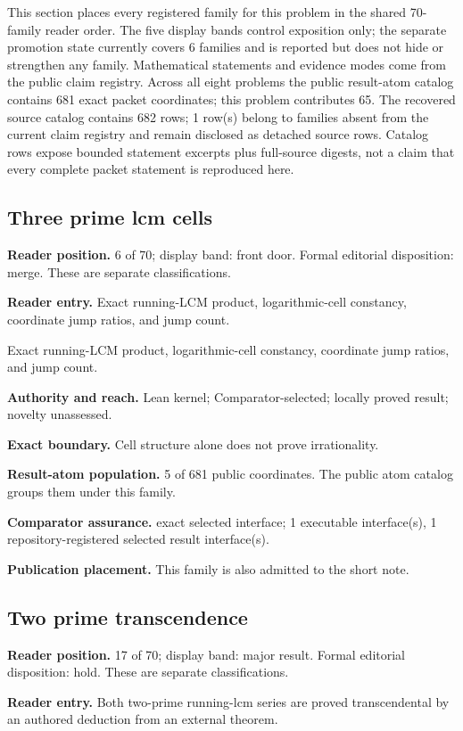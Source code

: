 \documentclass[11pt]{article}
\begin{document}
This section places every registered family for this problem in the shared 70-family reader order.  The five display bands control exposition only; the separate promotion state currently covers 6 families and is reported but does not hide or strengthen any family.  Mathematical statements and evidence modes come from the public claim registry.  Across all eight problems the public result-atom catalog contains 681 exact packet coordinates; this problem contributes 65.  The recovered source catalog contains 682 rows; 1 row(s) belong to families absent from the current claim registry and remain disclosed as detached source rows.  Catalog rows expose bounded statement excerpts plus full-source digests, not a claim that every complete packet statement is reproduced here.

\subsection{Three prime lcm cells}
\textbf{Reader position.} 6 of 70; display band: front door.  Formal editorial disposition: merge.  These are separate classifications.

\textbf{Reader entry.} Exact running-LCM product, logarithmic-cell constancy, coordinate jump ratios, and jump count.

Exact running-LCM product, logarithmic-cell constancy, coordinate jump ratios, and jump count.

\textbf{Authority and reach.} Lean kernel; Comparator-selected; locally proved result; novelty unassessed.

\textbf{Exact boundary.} Cell structure alone does not prove irrationality.

\textbf{Result-atom population.} 5 of 681 public coordinates. The public atom catalog groups them under this family.

\textbf{Comparator assurance.} exact selected interface; 1 executable interface(s), 1 repository-registered selected result interface(s).

\textbf{Publication placement.} This family is also admitted to the short note.

\subsection{Two prime transcendence}
\textbf{Reader position.} 17 of 70; display band: major result.  Formal editorial disposition: hold.  These are separate classifications.

\textbf{Reader entry.} Both two-prime running-lcm series are proved transcendental by an authored deduction from an external theorem.
\end{document}
